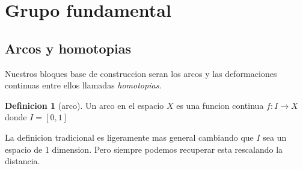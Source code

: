 \documentclass[letterpaper]{article}
\theoremstyle{definition}
\newtheorem{definicion}{Definicion}
\theoremstyle{plain}
\theoremstyle{plain}
\theoremstyle{remark}
\begin{document}
\section{Grupo fundamental}

\subsection{Arcos y homotopias}
Nuestros bloques base de construccion seran los arcos y las
deformaciones continuas entre ellos llamadas \emph{homotopias}.

\begin{definicion}[arco]
  Un arco en el espacio \(X\) es una funcion continua \(f : I \to X \)
  donde \(I = [0,1]\)
\end{definicion}
La definicion tradicional es ligeramente mas general cambiando que \(I\)
sea un espacio de 1 dimension. Pero siempre podemos recuperar esta
rescalando la distancia.
\end{document}
